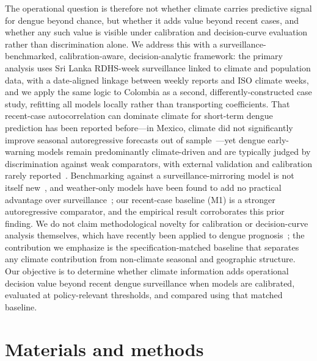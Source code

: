 \documentclass[11pt,a4paper]{article}
\begin{document}
The operational question is therefore not whether climate carries predictive signal for dengue beyond chance, but whether it adds value beyond recent cases, and whether any such value is visible under calibration and decision-curve evaluation rather than discrimination alone. We address this with a surveillance-benchmarked, calibration-aware, decision-analytic framework: the primary analysis uses Sri Lanka RDHS-week surveillance linked to climate and population data, with a date-aligned linkage between weekly reports and ISO climate weeks, and we apply the same logic to Colombia as a second, differently-constructed case study, refitting all models locally rather than transporting coefficients. That recent-case autocorrelation can dominate climate for short-term dengue prediction has been reported before---in Mexico, climate did not significantly improve seasonal autoregressive forecasts out of sample~\cite{Johansson2016}---yet dengue early-warning models remain predominantly climate-driven and are typically judged by discrimination against weak comparators, with external validation and calibration rarely reported~\cite{Leung2022,HussainAlkhateeb2021}. Benchmarking against a surveillance-mirroring model is not itself new~\cite{Lowe2013}, and weather-only models have been found to add no practical advantage over surveillance~\cite{Benedum2020}; our recent-case baseline (M1) is a stronger autoregressive comparator, and the empirical result corroborates this prior finding. We do not claim methodological novelty for calibration or decision-curve analysis themselves, which have recently been applied to dengue prognosis~\cite{Sangkaew2026}; the contribution we emphasize is the specification-matched baseline that separates any climate contribution from non-climate seasonal and geographic structure. Our objective is to determine whether climate information adds operational decision value beyond recent dengue surveillance when models are calibrated, evaluated at policy-relevant thresholds, and compared using that matched baseline.

\section{Materials and methods}
\end{document}

